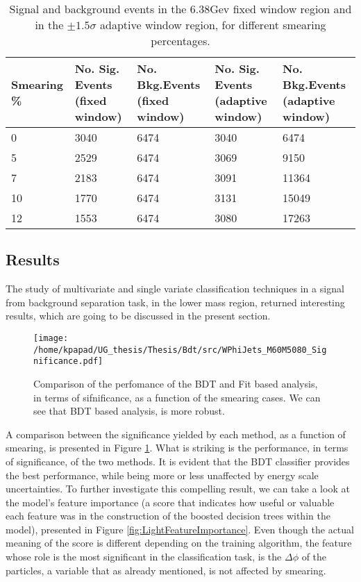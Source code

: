 \begin{table}[h!]
\centering
\begin{tabular}{|p{2cm}|p{3cm}|p{3cm}|p{3cm}|p{3cm}|}
 \hline
Smearing \%  & No. Sig. Events (fixed window) & No. Bkg.Events (fixed window) & No. Sig. Events (adaptive window) & No. Bkg.Events (adaptive window)  \\
\hline
0 & 3040 & 6474 & 3040 & 6474 \\
5 & 2529 & 6474 & 3069 & 9150 \\
7 & 2183 & 6474 & 3091 & 11364 \\
10 & 1770 & 6474 & 3131 & 15049 \\
12 & 1553 & 6474 & 3080 & 17263 \\
 \hline
\end{tabular}
\caption{Signal and background events in the 6.38Gev fixed window region and in the $\pm 1.5\sigma$ adaptive window region, for different smearing percentages.}
\label{table:NumSigBkg}
\end{table}

\subsection{Results}
\label{sec:org44050c1}
The study of multivariate and single variate classification techniques in a signal from background separation task, in the lower mass region, returned interesting results, which are going to be discussed in the present section. 
\begin{figure}[htbp]
\centering
\texttt{[image: /home/kpapad/UG\_thesis/Thesis/Bdt/src/WPhiJets\_M60M5080\_Significance.pdf]}
\caption{ Comparison of the perfomance of the BDT and Fit based analysis, in terms of sifnificance,  as a function of the smearing cases. We can see that BDT based analysis, is more robust.}
\label{fig:LightBdtFitSig}
\end{figure}

A comparison between the significance yielded by each method, as a function of smearing, is presented in Figure \ref{fig:LightBdtFitSig}. What is striking is the performance, in terms of significance, of the two methods. It is evident that the BDT classifier provides the best performance, while being more or less unaffected by energy scale uncertainties. To further investigate this compelling result, we can take a look at the model's feature importance (a score that indicates how useful or valuable each feature was in the construction of the boosted decision trees within the model), presented in Figure \ref{fig:LightFeatureImportance}. Even though the actual meaning of the score is different depending on the training algorithm, the feature whose role is the most significant in the classification task, is the \(\Delta\phi\) of the particles, a variable that as already mentioned, is not affected by smearing.

